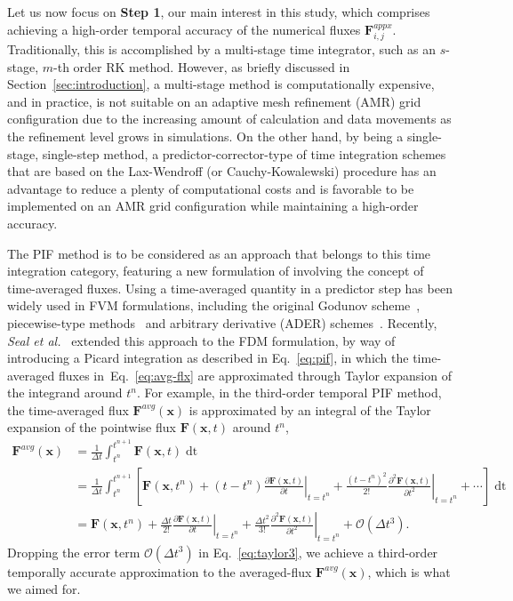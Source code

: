 \documentclass[times,preprint,3p]{elsarticle}
\newcommand{\pd}[2]{\frac{\partial #1}{\partial #2}}
\newcommand{\pdd}[2]{\frac{\partial^{2} #1}{\partial #2^{2}}}
\newcommand{\dt}{\Delta t}
\newcommand{\bF}{\mathbf{F}}
\newcommand{\bx}{\mathbf{x}}
\begin{document}
Let us now focus on \textbf{Step 1}, our main interest in this study, which comprises
achieving a high-order temporal accuracy
of the numerical fluxes $\bF^{appx}_{i,j}$.
Traditionally, this is accomplished
by a multi-stage time integrator, such as an $s$-stage, $m$-th order RK method.
However, as briefly discussed in Section~\ref{sec:introduction},
a multi-stage method is computationally expensive,
and in practice, is not suitable on an adaptive mesh refinement (AMR) grid configuration
due to the increasing amount of calculation and data movements
as the refinement level grows in simulations.
%
On the other hand, by being a single-stage, single-step method,
a predictor-corrector-type of time integration schemes that are based on
the Lax-Wendroff (or Cauchy-Kowalewski) procedure has an advantage
to reduce a plenty of computational costs and is favorable to be
implemented on an AMR grid configuration
while maintaining a high-order accuracy.

The PIF method is to be considered as an approach
that belongs to this time integration category, featuring a new formulation of involving
the concept of time-averaged fluxes.
Using a time-averaged quantity in a predictor step has been widely used in FVM formulations,
including the original Godunov scheme~\cite{godunov1959difference},
piecewise-type methods~\cite{colella1984piecewise, lee2017piecewise}
and arbitrary derivative (ADER)
schemes~\cite{titarev2002ader, titarev2005ader, balsara2009efficient}.
%
Recently, \textit{Seal et al.}~\cite{christlieb2015picard, seal2016explicit} extended this approach
to the FDM formulation, by way of introducing a Picard integration
as described in Eq.~\eqref{eq:pif}, in which the time-averaged fluxes in~Eq.~\eqref{eq:avg-flx}
are approximated through Taylor expansion of the integrand around $t^{n}$.
For example, in the third-order temporal PIF method, the time-averaged flux
$\bF^{avg}(\bx)$ is approximated by
an integral of the Taylor expansion of the pointwise flux $\bF(\bx,t)$ around $t^n$,
\begin{equation}\label{eq:taylor3}
    \begin{split}
        \bF^{avg}(\bx)
        &= \frac{1}{\dt} \int^{t^{n + 1}}_{t^n} \bF(\bx, t) \mathop{dt} \\
        & = \frac{1}{\dt} \int^{t^{n + 1}}_{t^n}
               \left[ \bF(\bx,t^n) +
               (t-t^n) \left.\pd{\bF(\bx,t)}{t}\right|_{t = t^{n}} +
               \frac{(t-t^n)^2}{2!}\left.\pdd{\bF(\bx,t)}{t}
               \right|_{t = t^{n}} + \cdots
               \right]\mathop{dt} \\
        & = \bF(\bx,t^n) + \frac{\dt}{2!} \left.\pd{\bF(\bx,t)}{t}\right|_{t = t^{n}}
                           + \left.\frac{\dt^{2}}{3!} \pdd{\bF(\bx,t)}{t}\right|_{t = t^{n}} + \mathcal{O}(\dt^{3}).
    \end{split}
\end{equation}
%
Dropping the error term $\mathcal{O}(\dt^{3})$ in Eq.~\eqref{eq:taylor3}, we achieve
a third-order temporally accurate approximation to the averaged-flux $\bF^{avg}(\bx)$,
which is what we aimed for.
\end{document}
